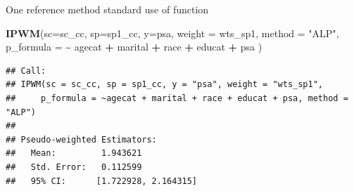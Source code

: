 \documentclass[
  ignorenonframetext,
]{beamer}
\newenvironment{Shaded}{\begin{snugshade}}{\end{snugshade}}
\newcommand{\AttributeTok}[1]{\textcolor[rgb]{0.13,0.29,0.53}{#1}}
\newcommand{\FunctionTok}[1]{\textcolor[rgb]{0.13,0.29,0.53}{\textbf{#1}}}
\newcommand{\NormalTok}[1]{#1}
\newcommand{\SpecialCharTok}[1]{\textcolor[rgb]{0.81,0.36,0.00}{\textbf{#1}}}
\newcommand{\StringTok}[1]{\textcolor[rgb]{0.31,0.60,0.02}{#1}}
\begin{document}
\begin{frame}[fragile]{One reference method}
\label{one-reference-method}
standard use of function

\begin{Shaded}
\begin{Highlighting}[]
\FunctionTok{IPWM}\NormalTok{(}\AttributeTok{sc=}\NormalTok{sc\_cc, }\AttributeTok{sp=}\NormalTok{sp1\_cc, }\AttributeTok{y=}\StringTok{\textquotesingle{}psa\textquotesingle{}}\NormalTok{, }\AttributeTok{weight =} \StringTok{\textquotesingle{}wts\_sp1\textquotesingle{}}\NormalTok{, }\AttributeTok{method =} \StringTok{"ALP"}\NormalTok{, }
     \AttributeTok{p\_formula =} \SpecialCharTok{\textasciitilde{}}\NormalTok{ agecat }\SpecialCharTok{+}\NormalTok{ marital }\SpecialCharTok{+}\NormalTok{ race }\SpecialCharTok{+}\NormalTok{ educat }\SpecialCharTok{+}\NormalTok{ psa )}
\end{Highlighting}
\end{Shaded}

\begin{verbatim}
## Call:
## IPWM(sc = sc_cc, sp = sp1_cc, y = "psa", weight = "wts_sp1", 
##     p_formula = ~agecat + marital + race + educat + psa, method = "ALP")
## 
## Pseudo-weighted Estimators:
##   Mean:         1.943621 
##   Std. Error:   0.112599 
##   95% CI:      [1.722928, 2.164315]
\end{verbatim}
\end{frame}
\end{document}
